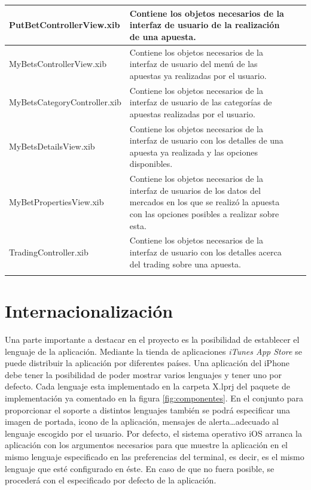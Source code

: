 \begin{tabularx}{15cm}{|lX|Xl|}
\hline
PutBetControllerView.xib & Contiene los objetos necesarios de la interfaz de usuario de la realización de una apuesta. \\
\hline
MyBetsControllerView.xib & Contiene los objetos necesarios de la interfaz de usuario del menú de las apuestas ya realizadas por el usuario. \\
\hline
MyBetsCategoryController.xib & Contiene los objetos necesarios de la interfaz de usuario de las categorías de apuestas realizadas por el usuario. \\
\hline
MyBetsDetailsView.xib & Contiene los objetos necesarios de la interfaz de usuario con los detalles de una apuesta ya realizada y las opciones disponibles. \\
\hline
MyBetPropertiesView.xib & Contiene los objetos necesarios de la interfaz de usuarios de los datos del mercados en los que se realizó la apuesta con las opciones posibles a realizar sobre esta. \\
\hline
TradingController.xib & Contiene los objetos necesarios de la interfaz de usuario con los detalles acerca del trading sobre una apuesta. \\
\hline 
\label{fig:componentes}
\end{tabularx} 
  
  
 
\section{Internacionalización}
 Una parte importante a destacar en el proyecto es la posibilidad de establecer el lenguaje de la aplicación. Mediante la tienda de aplicaciones \emph{iTunes App Store} se puede distribuir la aplicación por diferentes países. Una aplicación del iPhone debe tener la posibilidad de poder mostrar varios lenguajes y tener uno por defecto. Cada lenguaje esta implementado en la carpeta X.lprj del paquete de implementación ya comentado en la figura \ref{fig:componentes}. En el conjunto para proporcionar el soporte a distintos lenguajes también se podrá especificar una imagen  de portada, icono de la aplicación, mensajes de alerta\ldots  adecuado al lenguaje escogido por el usuario. Por defecto, el sistema operativo iOS arranca la aplicación con los argumentos necesarios para que muestre la aplicación en el mismo lenguaje especificado en las preferencias del terminal, es decir, es el mismo lenguaje que esté configurado en éste. En caso de que no fuera posible, se procederá con el especificado por defecto de la aplicación.

